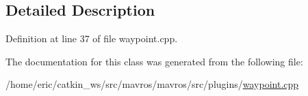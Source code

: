 \subsection{Detailed Description}


Definition at line 37 of file waypoint.\+cpp.



The documentation for this class was generated from the following file\+:\begin{DoxyCompactItemize}
\item 
/home/eric/catkin\+\_\+ws/src/mavros/mavros/src/plugins/\mbox{\hyperlink{waypoint_8cpp}{waypoint.\+cpp}}\end{DoxyCompactItemize}
